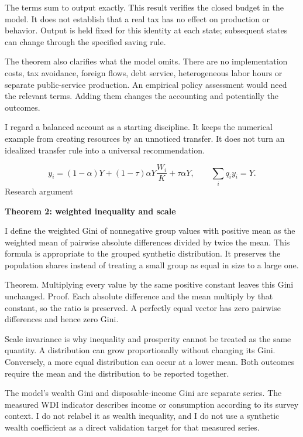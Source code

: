 \documentclass[10pt]{article}
\begin{document}
The terms sum to output exactly. This result verifies the closed budget in the model. It does not establish that a real tax has no effect on production or behavior. Output is held fixed for this identity at each state; subsequent states can change through the specified saving rule.\par
The theorem also clarifies what the model omits. There are no implementation costs, tax avoidance, foreign flows, debt service, heterogeneous labor hours or separate public-service production. An empirical policy assessment would need the relevant terms. Adding them changes the accounting and potentially the outcomes.\par
I regard a balanced account as a starting discipline. It keeps the numerical example from creating resources by an unnoticed transfer. It does not turn an idealized transfer rule into a universal recommendation.\par
\[y_i=(1-\alpha)Y+(1-\tau)\alpha Y\frac{W_i}{K}+\tau\alpha Y,\qquad\sum_iq_i y_i=Y.\]
\clearpage
{\small\color{accent}Research argument}\par
{\LARGE\bfseries\color{ink}Theorem 2: weighted inequality and scale}\par\vspace{7pt}
I define the weighted Gini of nonnegative group values with positive mean as the weighted mean of pairwise absolute differences divided by twice the mean. This formula is appropriate to the grouped synthetic distribution. It preserves the population shares instead of treating a small group as equal in size to a large one.\par
Theorem. Multiplying every value by the same positive constant leaves this Gini unchanged. Proof. Each absolute difference and the mean multiply by that constant, so the ratio is preserved. A perfectly equal vector has zero pairwise differences and hence zero Gini.\par
Scale invariance is why inequality and prosperity cannot be treated as the same quantity. A distribution can grow proportionally without changing its Gini. Conversely, a more equal distribution can occur at a lower mean. Both outcomes require the mean and the distribution to be reported together.\par
The model's wealth Gini and disposable-income Gini are separate series. The measured WDI indicator describes income or consumption according to its survey context. I do not relabel it as wealth inequality, and I do not use a synthetic wealth coefficient as a direct validation target for that measured series.\par
\end{document}

